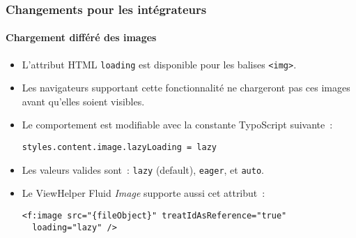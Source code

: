 
\begin{frame}[fragile]
	\frametitle{Changements pour les intégrateurs}
	\framesubtitle{Chargement différé des images}

	\lstset{basicstyle=\smaller\ttfamily}

	\begin{itemize}
		\item L'attribut HTML \texttt{loading} est disponible pour les balises \texttt{<img>}.
		\item Les navigateurs supportant cette fonctionnalité ne chargeront pas ces images
			avant qu'elles soient visibles.
		\item Le comportement est modifiable avec la constante TypoScript suivante~:

\vspace{-0.4cm}
\begin{lstlisting}
styles.content.image.lazyLoading = lazy
\end{lstlisting}

		\item Les valeurs valides sont~: \texttt{lazy} (default), \texttt{eager}, et \texttt{auto}.
		\item Le ViewHelper Fluid \textit{Image} supporte aussi cet attribut~:

\vspace{-0.4cm}
\begin{lstlisting}
<f:image src="{fileObject}" treatIdAsReference="true"
  loading="lazy" />
\end{lstlisting}

	\end{itemize}

\end{frame}


